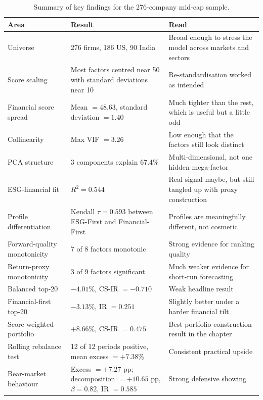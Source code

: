 \begin{table}[!htbp]
\centering
\caption{Summary of key findings for the 276-company mid-cap sample.}
\label{tab:summary}
\label{tab:descriptive_stats}
\label{tab:factor_corr_midcap}
\label{tab:portfolio_construction}
\label{tab:monotonicity}
\label{tab:highcap}
\footnotesize
\setlength{\tabcolsep}{4pt}
\renewcommand{\arraystretch}{0.96}
\begin{tabular}{p{3.6cm} p{4.0cm} p{5.6cm}}
\toprule
Area & Result & Read \\
\midrule
Universe & 276 firms, 186 US, 90 India & Broad enough to stress the model across markets and sectors \\
Score scaling & Most factors centred near 50 with standard deviations near 10 & Re-standardisation worked as intended \\
Financial score spread & Mean $=48.63$, standard deviation $=1.40$ & Much tighter than the rest, which is useful but a little odd \\
Collinearity & Max VIF $=3.26$ & Low enough that the factors still look distinct \\
PCA structure & 3 components explain 67.4\% & Multi-dimensional, not one hidden mega-factor \\
ESG-financial fit & $R^2 = 0.544$ & Real signal maybe, but still tangled up with proxy construction \\
Profile differentiation & Kendall $\tau = 0.593$ between ESG-First and Financial-First & Profiles are meaningfully different, not cosmetic \\
Forward-quality monotonicity & 7 of 8 factors monotonic & Strong evidence for ranking quality \\
Return-proxy monotonicity & 3 of 9 factors significant & Much weaker evidence for short-run forecasting \\
Balanced top-20 & $-4.01\%$, CS-IR $=-0.710$ & Weak headline result \\
Financial-first top-20 & $-3.13\%$, IR $=0.251$ & Slightly better under a harder financial tilt \\
Score-weighted portfolio & $+8.66\%$, CS-IR $=0.475$ & Best portfolio construction result in the chapter \\
Rolling rebalance test & 12 of 12 periods positive, mean excess $=+7.38\%$ & Consistent practical upside \\
Bear-market behaviour & Excess $=+7.27$ pp; decomposition $=+10.65$ pp, $\beta = 0.82$, IR $=0.585$ & Strong defensive showing \\

\end{tabular}
\end{table}

